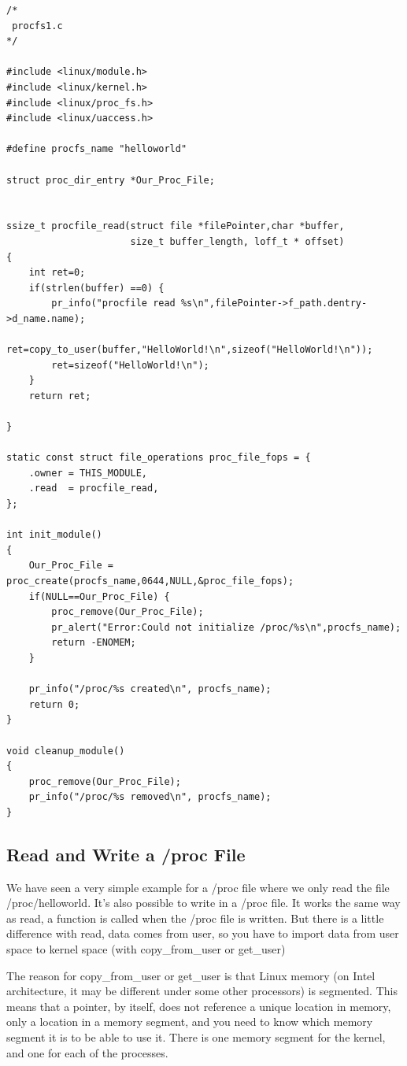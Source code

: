 \documentclass[11pt]{article}
\begin{document}
\begin{verbatim}
/*
 procfs1.c
*/

#include <linux/module.h>
#include <linux/kernel.h>
#include <linux/proc_fs.h>
#include <linux/uaccess.h>

#define procfs_name "helloworld"

struct proc_dir_entry *Our_Proc_File;


ssize_t procfile_read(struct file *filePointer,char *buffer,
                      size_t buffer_length, loff_t * offset)
{
    int ret=0;
    if(strlen(buffer) ==0) {
        pr_info("procfile read %s\n",filePointer->f_path.dentry->d_name.name);
        ret=copy_to_user(buffer,"HelloWorld!\n",sizeof("HelloWorld!\n"));
        ret=sizeof("HelloWorld!\n");
    }
    return ret;

}

static const struct file_operations proc_file_fops = {
    .owner = THIS_MODULE,
    .read  = procfile_read,
};

int init_module()
{
    Our_Proc_File = proc_create(procfs_name,0644,NULL,&proc_file_fops);
    if(NULL==Our_Proc_File) {
        proc_remove(Our_Proc_File);
        pr_alert("Error:Could not initialize /proc/%s\n",procfs_name);
        return -ENOMEM;
    }

    pr_info("/proc/%s created\n", procfs_name);
    return 0;
}

void cleanup_module()
{
    proc_remove(Our_Proc_File);
    pr_info("/proc/%s removed\n", procfs_name);
}
\end{verbatim}

\subsection*{Read and Write a /proc File}
\label{sec:org90393b7}
We have seen a very simple example for a /proc file where we only read the file /proc/helloworld. It's also possible to write in a /proc file. It works the same way as read, a function is called when the /proc file is written. But there is a little difference with read, data comes from user, so you have to import data from user space to kernel space (with copy\_from\_user or get\_user)

The reason for copy\_from\_user or get\_user is that Linux memory (on Intel architecture, it may be different under some other processors) is segmented. This means that a pointer, by itself, does not reference a unique location in memory, only a location in a memory segment, and you need to know which memory segment it is to be able to use it. There is one memory segment for the kernel, and one for each of the processes.
\end{document}
